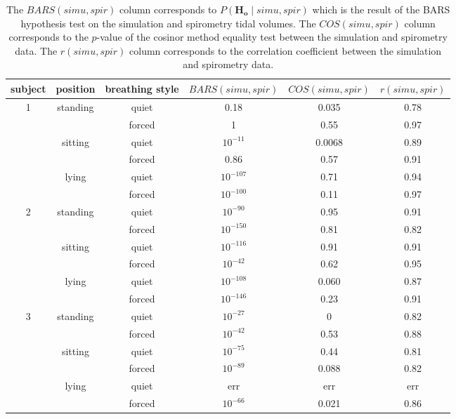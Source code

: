 \begin{table}
\begin{center}
	
\begin{tabular}{|c|c|c|c|c|c|}
\hline
 subject & position & breathing style & $BARS(simu,spir)$ & $COS(simu,spir)$ & $r(simu,spir)$ \\ 
\hline
\hline

 \multirow{6}{*}{1} & \multirow{2}{*}{standing} & quiet & 0.18 & 0.035 & 0.78\\ 
 & & forced & 1 & 0.55 & 0.97 \\ \cline{2-6}
 & \multirow{2}{*}{sitting} & quiet & $10^{-11}$ & 0.0068 & 0.89\\ 
 & & forced & 0.86 & 0.57 & 0.91 \\ \cline{2-6}
 & \multirow{2}{*}{lying} & quiet & $10^{-107}$ & 0.71 & 0.94 \\ 
 & & forced & $10^{-100}$ & 0.11 & 0.97 \\ \hline \hline
 
 \multirow{6}{*}{2} & \multirow{2}{*}{standing} & quiet & $10^{-90}$ & 0.95 & 0.91 \\ 
 & & forced & $10^{-150}$ & 0.81 & 0.82 \\ \cline{2-6}
 & \multirow{2}{*}{sitting} & quiet & $10^{-116}$ & 0.91 & 0.91 \\ 
 & & forced & $10^{-42}$ & 0.62 & 0.95 \\ \cline{2-6}
 & \multirow{2}{*}{lying} & quiet & $10^{-108}$ & 0.060 & 0.87 \\ 
 & & forced & $10^{-146}$ & 0.23 & 0.91 \\ \hline \hline
 
 \multirow{6}{*}{3} & \multirow{2}{*}{standing} & quiet & $10^{-27}$ & 0 & 0.82 \\ 
 & & forced & $10^{-42}$ & 0.53 & 0.88 \\ \cline{2-6}
 & \multirow{2}{*}{sitting} & quiet & $10^{-75}$ & 0.44 & 0.81 \\ 
 & & forced & $10^{-89}$ & 0.088 & 0.82 \\ \cline{2-6}
 & \multirow{2}{*}{lying} & quiet & err & err & err \\ 
 & & forced & $10^{-66}$ & 0.021 & 0.86 \\

\hline
\end{tabular}
\end{center}
\caption[Results of the correlation, cosinor and BARS methods]{\label{tab:likelihood} 
The $BARS(simu,spir)$ column corresponds to $P(\mathbf{H_o} \mid simu,spir)$ which is the result of the BARS hypothesis test on the simulation and spirometry tidal volumes.
The $COS(simu,spir)$ column corresponds to the $p$-value of the cosinor method equality test between the simulation and spirometry data. 
The $r(simu,spir)$ column corresponds to the correlation coefficient between the simulation and spirometry data.
}
\end{table}